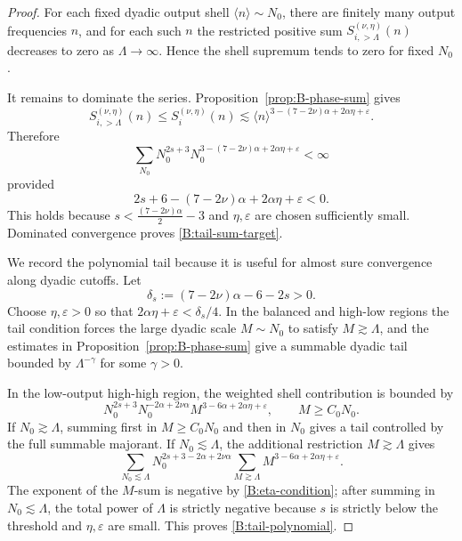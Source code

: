 \documentclass[10pt]{amsart}
\numberwithin{equation}{section}
\theoremstyle{plain}
\theoremstyle{definition}
\theoremstyle{remark}
\newcommand{\eps}{\varepsilon}
\newcommand{\la}{\langle}
\newcommand{\ra}{\rangle}
\begin{document}
\begin{proof}
For each fixed dyadic output shell \(\la n\ra\sim N_0\), there are finitely many output frequencies \(n\), and for each such \(n\) the restricted positive sum \(S_{i,>\Lambda}^{(\nu,\eta)}(n)\) decreases to zero as \(\Lambda\to\infty\).  Hence the shell supremum tends to zero for fixed \(N_0\).

It remains to dominate the series.  Proposition~\ref{prop:B-phase-sum} gives
\[
        S_{i,>\Lambda}^{(\nu,\eta)}(n)
        \le S_i^{(\nu,\eta)}(n)
        \lesssim
        \la n\ra^{3-(7-2\nu)\alpha+2\alpha\eta+\eps}.
\]
Therefore
\[
        \sum_{N_0}
        N_0^{2s+3}
        N_0^{3-(7-2\nu)\alpha+2\alpha\eta+\eps}<\infty
\]
provided
\[
        2s+6-(7-2\nu)\alpha+2\alpha\eta+\eps<0.
\]
This holds because \(s<\frac{(7-2\nu)\alpha}{2}-3\) and \(\eta,\eps\) are chosen sufficiently small.  Dominated convergence proves \eqref{B:tail-sum-target}.

We record the polynomial tail because it is useful for almost sure convergence along dyadic cutoffs.  Let
\[
        \delta_s:=(7-2\nu)\alpha-6-2s>0.
\]
Choose \(\eta,\eps>0\) so that \(2\alpha\eta+\eps<\delta_s/4\).  In the balanced and high-low regions the tail condition forces the large dyadic scale \(M\sim N_0\) to satisfy \(M\gtrsim\Lambda\), and the estimates in Proposition~\ref{prop:B-phase-sum} give a summable dyadic tail bounded by \(\Lambda^{-\gamma}\) for some \(\gamma>0\).

In the low-output high-high region, the weighted shell contribution is bounded by
\[
        N_0^{2s+3}N_0^{-2\alpha+2\nu\alpha}
        M^{3-6\alpha+2\alpha\eta+\eps},
        \qquad M\ge C_0N_0.
\]
If \(N_0\gtrsim\Lambda\), summing first in \(M\ge C_0N_0\) and then in \(N_0\) gives a tail controlled by the full summable majorant.  If \(N_0\lesssim\Lambda\), the additional restriction \(M\gtrsim\Lambda\) gives
\[
        \sum_{N_0\lesssim\Lambda}
        N_0^{2s+3-2\alpha+2\nu\alpha}
        \sum_{M\gtrsim\Lambda}M^{3-6\alpha+2\alpha\eta+\eps}.
\]
The exponent of the \(M\)-sum is negative by \eqref{B:eta-condition}; after summing in \(N_0\lesssim\Lambda\), the total power of \(\Lambda\) is strictly negative because \(s\) is strictly below the threshold and \(\eta,\eps\) are small.  This proves \eqref{B:tail-polynomial}.
\end{proof}
\end{document}
